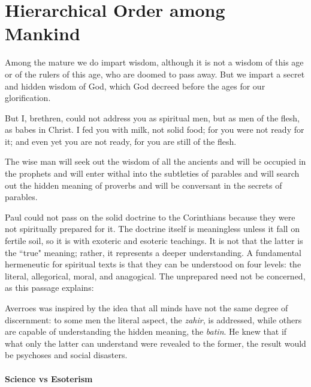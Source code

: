 \section{Hierarchical Order among Mankind}

\begin{quotex}
Among the mature we do impart wisdom, although it is not a wisdom of this age or of the rulers of this age, who are doomed to pass away. But we impart a secret and hidden wisdom of God, which God decreed before the ages for our glorification. 

But I, brethren, could not address you as spiritual men, but as men of the flesh, as babes in Christ. I fed you with milk, not solid food; for you were not ready for it; and even yet you are not ready, for you are still of the flesh. 

The wise man will seek out the wisdom of all the ancients and will be occupied in the prophets and will enter withal into the subtleties of parables and will search out the hidden meaning of proverbs and will be conversant in the secrets of parables. 

\end{quotex}
Paul could not pass on the solid doctrine to the Corinthians because they were not spiritually prepared for it. The doctrine itself is meaningless unless it fall on fertile soil, so it is with exoteric and esoteric teachings. It is not that the latter is the ``true" meaning; rather, it represents a deeper understanding. A fundamental hermeneutic for spiritual texts is that they can be understood on four levels: the literal, allegorical, moral, and anagogical. The unprepared need not be concerned, as this passage explains:

\begin{quotex}
Averroes was inspired by the idea that all minds have not the same degree of discernment: to some men the literal aspect, the \emph{zahir}, is addressed, while others are capable of understanding the hidden meaning, the \emph{batin}. He knew that if what only the latter can understand were revealed to the former, the result would be psychoses and social disasters. 

\end{quotex}
\paragraph{Science vs Esoterism}


